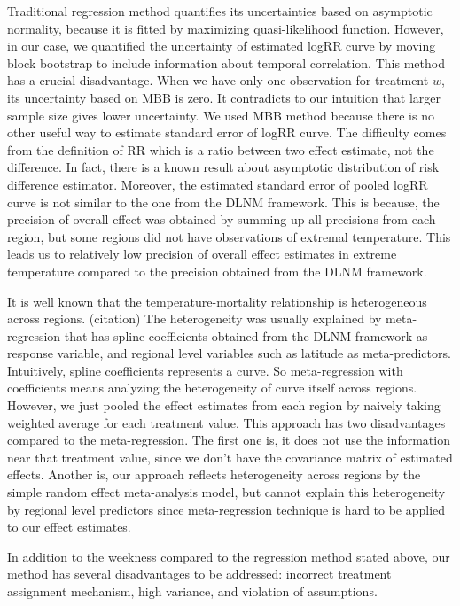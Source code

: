 \documentclass[12pt]{article}
\begin{document}
Traditional regression method quantifies its uncertainties based on asymptotic normality,
because it is fitted by maximizing quasi-likelihood function.
However, in our case, we quantified the uncertainty of estimated logRR curve by moving block bootstrap
to include information about temporal correlation.
This method has a crucial disadvantage.
When we have only one observation for treatment $w$, its uncertainty based on MBB is zero.
It contradicts to our intuition that larger sample size gives lower uncertainty.
We used MBB method because there is no other useful way to estimate standard error of logRR curve.
The difficulty comes from the definition of RR
which is a ratio between two effect estimate, not the difference.
In fact, there is a known result about asymptotic distribution of risk difference estimator.
Moreover, the estimated standard error of pooled logRR curve is not similar to the one from the DLNM framework.
This is because,
the precision of overall effect was obtained by summing up all precisions from each region,
but some regions did not have observations of extremal temperature.
This leads us to relatively low precision of overall effect estimates in extreme temperature
compared to the precision obtained from the DLNM framework.


It is well known that the temperature-mortality relationship is heterogeneous across regions. (citation)
The heterogeneity was usually explained by meta-regression
that has spline coefficients obtained from the DLNM framework as response variable, 
and regional level variables such as latitude as meta-predictors.
Intuitively, spline coefficients represents a curve.
So meta-regression with coefficients means analyzing the heterogeneity of curve itself across regions.
However, we just pooled the effect estimates from each region 
by naively taking weighted average for each treatment value.
This approach has two disadvantages compared to the meta-regression.
The first one is, it does not use the information near that treatment value,
since we don't have the covariance matrix of estimated effects.
Another is, our approach reflects heterogeneity across regions by the simple random effect meta-analysis model, 
but cannot explain this heterogeneity by regional level predictors
since meta-regression technique is hard to be applied to our effect estimates.

In addition to the weekness compared to the regression method stated above,
our method has several disadvantages to be addressed:
incorrect treatment assignment mechanism, high variance, and violation of assumptions.
\end{document}
